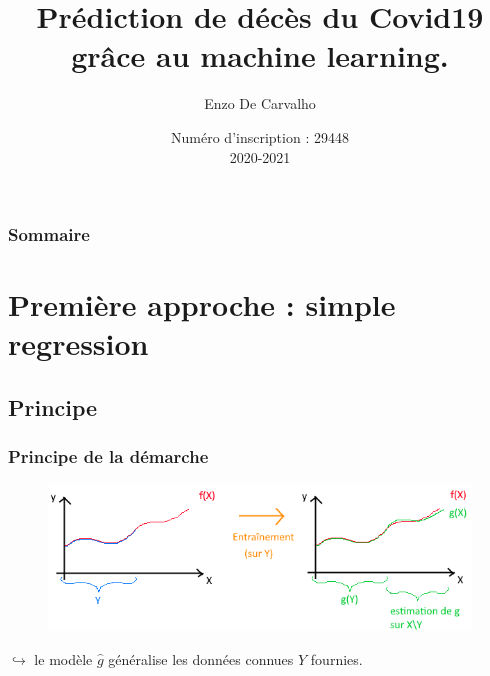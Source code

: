 \documentclass{beamer}[aspectratio = 43]
\title{Prédiction de décès du Covid19 grâce au machine learning.}
\subtitle{}
\author{Enzo De Carvalho}
\date{
	Numéro d'inscription : 29448\\%
	\vspace{5pt}
	2020-2021\\%
	}
\begin{document}
\begin{frame}
	\maketitle
\end{frame}

\begin{frame}
	\frametitle{Sommaire}
	\tableofcontents
\end{frame}

\section{Première approche : simple regression}
\subsection*{Principe}
\begin{frame}
	\frametitle{Principe de la démarche}
	\begin{figure}[t]
		\centering
		\includegraphics[scale=0.7]{super_schema}
	\end{figure}
	$\hookrightarrow$ le modèle $\hat{g}$ généralise les données connues $Y$ fournies.
\end{frame}
\end{document}
